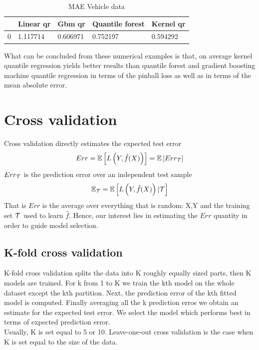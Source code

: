 \begin{table}
    \caption{MAE Vehicle data}
    \begin{tabular}{lllll}
    \toprule
     & Linear qr & Gbm qr & Quantile forest & Kernel qr \\
    \midrule
    0 & 1.117714 & 0.606971 & 0.752197 & 0.594292 \\
    \bottomrule
    \end{tabular}
\end{table}
What can be concluded from these numerical examples is that, on average kernel quantile regression yields better results than quantile forest \cite{meinshausen2006quantile} and gradient boosting machine quantile regression \cite {friedman2001greedy} in terms of the pinball loss as well as in terms of the mean absolute error.



\section{Cross validation}\label{appendix:cross_validation}
Cross validation directly estimates the expected test error
\begin{equation}
    Err=\mathbb{E}\left[L\left(Y,\hat{f}(X)\right)\right]=\mathbb{E}\left[Err_{\mathcal{T}}\right]
\end{equation}
$Err_{\mathcal{T}}$ is the prediction error over an independent test sample
\begin{equation}
    \mathbb{E}_{\mathcal{T}}=\mathbb{E}\left[L\left(Y,\hat{f}(X)\right)| \mathcal{T} \right]
\end{equation}
That is $Err$ is the average over everything that is random: X,Y and the training set $\mathcal{T}$ used to learn $\hat{f}$. Hence, our interest lies in estimating the $Err$ quantity in order to guide model selection.
\subsection{K-fold cross validation}
K-fold cross validation splits the data into K roughly equally sized parts, then K models are trained. For k from 1 to K we train the kth model on the whole dataset except the kth partition. Next,  the prediction error of the kth fitted model is computed. Finally averaging all the k prediction erros we obtain an estimate for the expected test error. We select the model which performs best in terms of expected prediction error.
\\
Usually, K is set equal to 5 or 10. Leave-one-out cross validation is the case when K is set equal to the size of the data.
